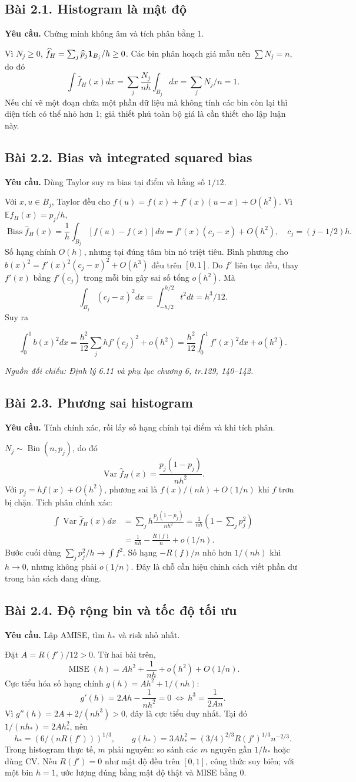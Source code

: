 \documentclass[11pt,a4paper]{article}
\newcommand{\E}{\mathbb E}\newcommand{\Pp}{\mathbb P}
\DeclareMathOperator{\Var}{Var}\DeclareMathOperator{\Cov}{Cov}
\DeclareMathOperator{\Bias}{Bias}\DeclareMathOperator{\MSE}{MSE}
\DeclareMathOperator{\MISE}{MISE}\DeclareMathOperator{\AMISE}{AMISE}
\newcommand{\src}[1]{\textit{Nguồn đối chiếu: #1.}}
\newcommand{\prob}[3]{\subsection{Bài #1. #2}\label{b:#1}\textbf{Yêu cầu.} #3\par}
\begin{document}
\prob{2.1}{Histogram là mật độ}{Chứng minh không âm và tích phân bằng 1.}
Vì $N_j\ge0$, $\widehat f_H=\sum_j\widehat p_j\mathbf 1_{B_j}/h\ge0$. Các bin phân hoạch giá mẫu nên $\sum N_j=n$, do đó
\[
\int\widehat f_H(x)dx=\sum_j\frac{N_j}{nh}\int_{B_j}dx=\sum_jN_j/n=1.
\]
Nếu chỉ vẽ một đoạn chứa một phần dữ liệu mà không tính các bin còn lại thì diện tích có thể nhỏ hơn 1; giả thiết phủ toàn bộ giá là cần thiết cho lập luận này.

\prob{2.2}{Bias và integrated squared bias}{Dùng Taylor suy ra bias tại điểm và hằng số $1/12$.}
Với $x,u\in B_j$, Taylor đều cho $f(u)=f(x)+f'(x)(u-x)+O(h^2)$. Vì $\E\widehat f_H(x)=p_j/h$,
\[
\Bias\widehat f_H(x)=\frac1h\int_{B_j}[f(u)-f(x)]du
=f'(x)(c_j-x)+O(h^2),\quad c_j=(j-1/2)h.
\]
Số hạng chính $O(h)$, nhưng tại đúng tâm bin nó triệt tiêu. Bình phương cho
$b(x)^2=f'(x)^2(c_j-x)^2+O(h^3)$ đều trên $[0,1]$. Do $f'$ liên tục đều, thay $f'(x)$ bằng $f'(c_j)$ trong mỗi bin gây sai số tổng $o(h^2)$. Mà
\[
\int_{B_j}(c_j-x)^2dx=\int_{-h/2}^{h/2}t^2dt=h^3/12.
\]
Suy ra
\begin{result}
\[
\int_0^1b(x)^2dx=\frac{h^2}{12}\sum_jh f'(c_j)^2+o(h^2)
=\frac{h^2}{12}\int_0^1f'(x)^2dx+o(h^2).
\]
\end{result}
\src{Định lý 6.11 và phụ lục chương 6, tr.129, 140--142}

\prob{2.3}{Phương sai histogram}{Tính chính xác, rồi lấy số hạng chính tại điểm và khi tích phân.}
$N_j\sim\operatorname{Bin}(n,p_j)$, do đó
\[
\Var\widehat f_H(x)=\frac{p_j(1-p_j)}{nh^2}.
\]
Với $p_j=hf(x)+O(h^2)$, phương sai là $f(x)/(nh)+O(1/n)$ khi $f$ trơn bị chặn. Tích phân chính xác:
\begin{align*}
\int\Var\widehat f_H(x)dx
&=\sum_jh\frac{p_j(1-p_j)}{nh^2}
=\frac1{nh}\left(1-\sum_jp_j^2\right)\\
&=\frac1{nh}-\frac{R(f)}n+o(1/n).
\end{align*}
Bước cuối dùng $\sum_jp_j^2/h\to\int f^2$. Số hạng $-R(f)/n$ nhỏ hơn $1/(nh)$ khi $h\to0$, nhưng không phải $o(1/n)$. Đây là chỗ cần hiệu chỉnh cách viết phần dư trong bản sách đang dùng.

\prob{2.4}{Độ rộng bin và tốc độ tối ưu}{Lập AMISE, tìm $h_*$ và risk nhỏ nhất.}
Đặt $A=R(f')/12>0$. Từ hai bài trên,
\[
\MISE(h)=Ah^2+\frac1{nh}+o(h^2)+O(1/n).
\]
Cực tiểu hóa số hạng chính $g(h)=Ah^2+1/(nh)$:
\[
g'(h)=2Ah-\frac1{nh^2}=0\ \Longleftrightarrow\ h^3=\frac1{2An}.
\]
Vì $g''(h)=2A+2/(nh^3)>0$, đây là cực tiểu duy nhất. Tại đó $1/(nh_*)=2Ah_*^2$, nên
\[
h_*=(6/(nR(f')))^{1/3},\qquad
g(h_*)=3Ah_*^2=(3/4)^{2/3}R(f')^{1/3}n^{-2/3}.
\]
Trong histogram thực tế, $m$ phải nguyên: so sánh các $m$ nguyên gần $1/h_*$ hoặc dùng CV. Nếu $R(f')=0$ như mật độ đều trên $[0,1]$, công thức suy biến; với một bin $h=1$, ước lượng đúng bằng mật độ thật và MISE bằng 0.
\end{document}
